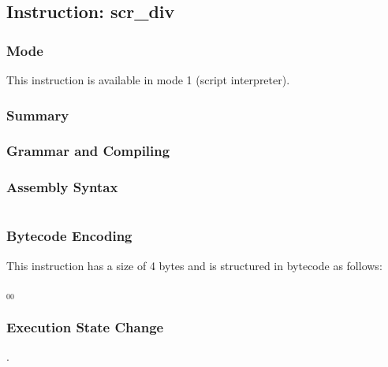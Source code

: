 \subsection{Instruction: scr\_div}

\subsubsection{Mode}
This instruction is available in mode 1 (script interpreter).
\subsubsection{Summary}


\subsubsection{Grammar and Compiling}


\subsubsection{Assembly Syntax}

\begin{myquote}
\begin{verbatim}

\end{verbatim}
\end{myquote}

\subsubsection{Bytecode Encoding}

This instruction has a size of 4 bytes and is structured in bytecode as follows:

$_{00}$\ 


\subsubsection{Execution State Change}

.


